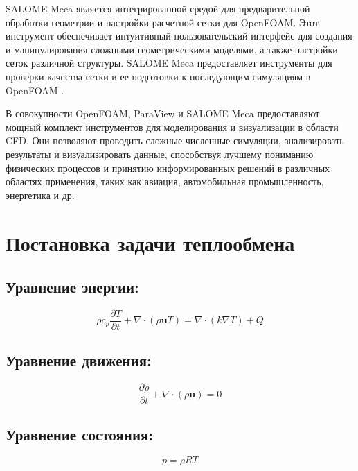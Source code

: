 \documentclass[a4paper,12pt]{article}
\theoremstyle{plain} %
\theoremstyle{definition} %
\theoremstyle{remark} %
\begin{document}
SALOME Meca является интегрированной средой для предварительной обработки геометрии и настройки расчетной сетки для OpenFOAM. Этот инструмент обеспечивает интуитивный пользовательский интерфейс для создания и манипулирования сложными геометрическими моделями, а также настройки сеток различной структуры. SALOME Meca предоставляет инструменты для проверки качества сетки и ее подготовки к последующим симуляциям в OpenFOAM \cite{wOfDocSalome}.

В совокупности OpenFOAM, ParaView и SALOME Meca предоставляют мощный комплект инструментов для моделирования и визуализации в области CFD. Они позволяют проводить сложные численные симуляции, анализировать результаты и визуализировать данные, способствуя лучшему пониманию физических процессов и принятию информированных решений в различных областях применения, таких как авиация, автомобильная промышленность, энергетика и др.

\newpage

\section*{Постановка задачи теплообмена}

\subsection*{Уравнение энергии:}

\begin{equation}
	\rho c_p \frac{\partial T}{\partial t} + \nabla \cdot (\rho \mathbf{u} T) = \nabla \cdot (k \nabla T) + Q
\end{equation}

\subsection*{Уравнение движения:}

\begin{equation}
	\frac{\partial \rho}{\partial t} + \nabla \cdot (\rho \mathbf{u}) = 0
\end{equation}

\subsection*{Уравнение состояния:}

\begin{equation}
	p = \rho R T
\end{equation}
\end{document}
